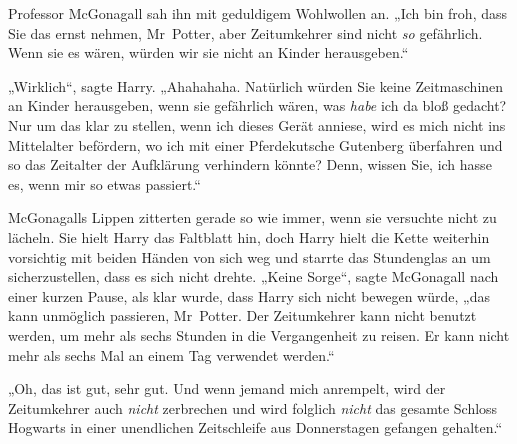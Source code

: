 Professor McGonagall sah ihn mit geduldigem Wohlwollen an. „Ich bin froh, dass Sie das ernst nehmen, Mr~Potter, aber Zeitumkehrer sind nicht \emph{so} gefährlich. Wenn sie es wären, würden wir sie nicht an Kinder herausgeben.“

„Wirklich“, sagte Harry. „Ahahahaha. Natürlich würden Sie keine Zeitmaschinen an Kinder herausgeben, wenn sie gefährlich wären, was \emph{habe} ich da bloß gedacht? Nur um das klar zu stellen, wenn ich dieses Gerät anniese, wird es mich nicht ins Mittelalter befördern, wo ich mit einer Pferdekutsche Gutenberg überfahren und so das Zeitalter der Aufklärung verhindern könnte? Denn, wissen Sie, ich hasse es, wenn mir so etwas passiert.“

McGonagalls Lippen zitterten gerade so wie immer, wenn sie versuchte nicht zu lächeln. Sie hielt Harry das Faltblatt hin, doch Harry hielt die Kette weiterhin vorsichtig mit beiden Händen von sich weg und starrte das Stundenglas an um sicherzustellen, dass es sich nicht drehte. „Keine Sorge“, sagte McGonagall nach einer kurzen Pause, als klar wurde, dass Harry sich nicht bewegen würde, „das kann unmöglich passieren, Mr~Potter. Der Zeitumkehrer kann nicht benutzt werden, um mehr als sechs Stunden in die Vergangenheit zu reisen. Er kann nicht mehr als sechs Mal an einem Tag verwendet werden.“

„Oh, das ist gut, sehr gut. Und wenn jemand mich anrempelt, wird der Zeitumkehrer auch \emph{nicht} zerbrechen und wird folglich \emph{nicht} das gesamte Schloss Hogwarts in einer unendlichen Zeitschleife aus Donnerstagen gefangen gehalten.“

